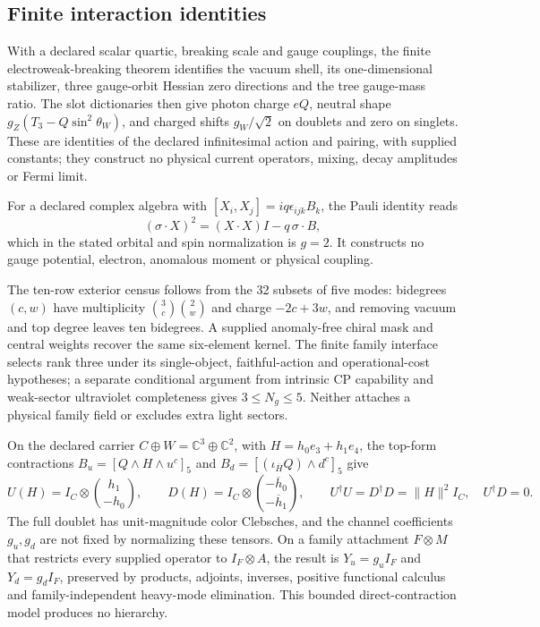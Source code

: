 \documentclass[11pt]{article}
\begin{document}
\subsection{Finite interaction identities}

With a declared scalar quartic, breaking scale and gauge couplings, the
finite electroweak-breaking theorem identifies the vacuum shell, its
one-dimensional stabilizer, three gauge-orbit Hessian zero directions and the
tree gauge-mass ratio. The slot dictionaries then give photon charge \(eQ\),
neutral shape \(g_Z(T_3-Q\sin^2\theta_W)\), and charged shifts \(g_W/\sqrt2\)
on doublets and zero on singlets. These are identities of the declared
infinitesimal action and pairing, with supplied constants; they construct no
physical current operators, mixing, decay amplitudes or Fermi limit.

For a declared complex algebra with \([X_i,X_j]=iq\epsilon_{ijk}B_k\), the
Pauli identity reads
\[
 (\sigma\cdot X)^2=(X\cdot X)I-q\,\sigma\cdot B,
\]
which in the stated orbital and spin normalization is \(g=2\). It constructs
no gauge potential, electron, anomalous moment or physical coupling.

The ten-row exterior census follows from the 32 subsets of five modes:
bidegrees \((c,w)\) have multiplicity \(\binom3c\binom2w\) and charge
\(-2c+3w\), and removing vacuum and top degree leaves ten bidegrees. A
supplied anomaly-free chiral mask and central weights recover the same
six-element kernel. The finite family interface selects rank three under its
single-object, faithful-action and operational-cost hypotheses; a separate
conditional argument from intrinsic CP capability and weak-sector
ultraviolet completeness gives \(3\le N_g\le5\). Neither attaches a physical
family field or excludes extra light sectors.

On the declared carrier \(C\oplus W=\mathbb C^3\oplus\mathbb C^2\), with
\(H=h_0e_3+h_1e_4\), the top-form contractions
\(B_u=[Q\wedge H\wedge u^c]_5\) and
\(B_d=[(\iota_{\overline H}Q)\wedge d^c]_5\) give
\[
 U(H)=I_C\otimes\binom{h_1}{-h_0},\qquad
 D(H)=I_C\otimes\binom{-\overline h_0}{-\overline h_1},\qquad
 U^\dagger U=D^\dagger D=\|H\|^2I_C,\quad U^\dagger D=0 .
\]
The full doublet has unit-magnitude color Clebsches, and the channel
coefficients \(g_u,g_d\) are not fixed by normalizing these tensors. On a
family attachment \(F\otimes M\) that restricts every supplied operator to
\(I_F\otimes A\), the result is \(Y_u=g_uI_F\) and \(Y_d=g_dI_F\), preserved
by products, adjoints, inverses, positive functional calculus and
family-independent heavy-mode elimination. This bounded direct-contraction
model produces no hierarchy.
\end{document}
